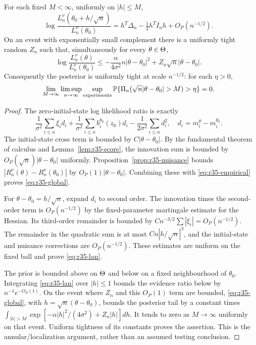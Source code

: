 \begin{theorem}\label{thm:r35-lan}
For each fixed $M<\infty$, uniformly on $|h|\le M$,
\begin{equation}\label{eq:r35-lan}
 \log\frac{L_n^\nu(\theta_0+h/\sqrt n)}{L_n^\nu(\theta_0)}
 =h^T\Delta_n-\tfrac12h^TI_nh+O_P(n^{-1/2}).
\end{equation}
On an event with exponentially small complement there is a uniformly tight random $Z_n$ such that, simultaneously for every $\theta\in\Theta$,
\begin{equation}\label{eq:r35-global}
 \log\frac{L_n^\nu(\theta)}{L_n^\nu(\theta_0)}
 \le -\frac\alpha{4\sigma^2}n|\theta-\theta_0|^2
                   +Z_n\sqrt n|\theta-\theta_0|.
\end{equation}
Consequently the posterior is uniformly tight at scale $n^{-1/2}$: for each $\eta>0$,
\[
 \lim_{M\to\infty}\limsup_{n\to\infty}\sup_{\mathrm{experiments}}
 \Prob\{\Pi_n(\sqrt n|\theta-\theta_0|>M)>\eta\}=0.
\]
\end{theorem}
\begin{proof}
The zero-initial-state log likelihood ratio is exactly
\[
 \frac1{\sigma^2}\sum_{i\le n}\xi_i d_i
 +\frac1{\sigma^2}\sum_{i\le n}b_i^{\theta_0}(z_0)d_i
 -\frac1{2\sigma^2}\sum_{i\le n}d_i^2,
 \quad d_i=m_i^\theta-m_i^{\theta_0}.
\]
The initial-state cross term is bounded by $C|\theta-\theta_0|$. By the fundamental theorem of calculus and Lemma~\ref{lem:r35-score}, the innovation sum is bounded by $O_P(\sqrt n)|\theta-\theta_0|$ uniformly. Proposition~\ref{prop:r35-nuisance} bounds $|R_n^\nu(\theta)-R_n^\nu(\theta_0)|$ by $O_P(1)|\theta-\theta_0|$. Combining these with \eqref{eq:r35-empirical} proves \eqref{eq:r35-global}.

For $\theta-\theta_0=h/\sqrt n$, expand $d_i$ to second order. The innovation times the second-order term is $O_P(n^{-1/2})$ by the fixed-parameter martingale estimate for the Hessian. Its third-order remainder is bounded by $Cn^{-3/2}\sum|\xi_i|=O_P(n^{-1/2})$. The remainder in the quadratic sum is at most $Cn|h/\sqrt n|^3$, and the initial-state and nuisance corrections are $O_P(n^{-1/2})$. These estimates are uniform on the fixed ball and prove \eqref{eq:r35-lan}.

The prior is bounded above on $\Theta$ and below on a fixed neighbourhood of $\theta_0$. Integrating \eqref{eq:r35-lan} over $|h|\le1$ bounds the evidence ratio below by $n^{-1}e^{-O_P(1)}$. On the event where $Z_n$ and this $O_P(1)$ term are bounded, \eqref{eq:r35-global}, with $h=\sqrt n(\theta-\theta_0)$, bounds the posterior tail by a constant times
$\int_{|h|>M}\exp[-\alpha|h|^2/(4\sigma^2)+Z_n|h|]dh$.
It tends to zero as $M\to\infty$ uniformly on that event. Uniform tightness of its constants proves the assertion. This is the annular/localization argument, rather than an assumed testing conclusion.
\end{proof}

